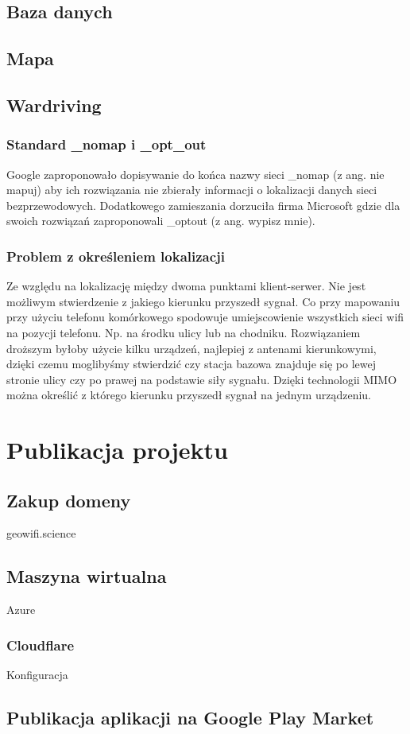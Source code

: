 \subsection{Baza danych}
\subsection{Mapa}

\subsection{Wardriving}
\subsubsection{Standard \_nomap i \_opt\_out}
Google zaproponowało dopisywanie do końca nazwy sieci \_nomap (z ang. nie mapuj) aby ich rozwiązania nie zbierały informacji o lokalizacji danych sieci bezprzewodowych.\cite{GoogleNomap} Dodatkowego zamieszania dorzuciła firma Microsoft gdzie dla swoich rozwiązań zaproponowali \_optout (z ang. wypisz mnie).\cite{MicrosoftOptout}

\subsubsection{Problem z określeniem lokalizacji}
Ze względu na lokalizację między dwoma punktami klient-serwer. Nie jest możliwym stwierdzenie z jakiego kierunku przyszedł sygnał. Co przy mapowaniu przy użyciu telefonu komórkowego spodowuje umiejscowienie wszystkich sieci wifi na pozycji telefonu. Np. na środku ulicy lub na chodniku.
Rozwiązaniem droższym byłoby użycie kilku urządzeń, najlepiej z antenami kierunkowymi, dzięki czemu moglibyśmy stwierdzić czy stacja bazowa znajduje się po lewej stronie ulicy czy po prawej na podstawie siły sygnału.
Dzięki technologii MIMO można określić z którego kierunku przyszedł sygnał na jednym urządzeniu.


\section{Publikacja projektu}
\subsection{Zakup domeny}
geowifi.science
\subsection{Maszyna wirtualna}
Azure
\subsubsection{Cloudflare}
Konfiguracja
\subsection{Publikacja aplikacji na Google Play Market} %